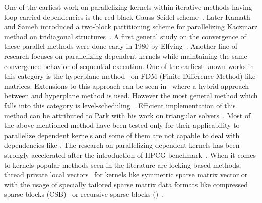 
One of the earliest work on parallelizing kernels within iterative methods having loop-carried dependencies is the red-black Gauss-Seidel 
scheme~\cite{RBGS}. 
Later Kamath and Sameh introduced a two-block partitioning scheme for parallelizing Kaczmarz method on tridiagonal structures~\cite{Kamath}. 
A first general study on the convergence of these parallel methods were done early in 1980 by Elfving~\cite{Elfving1980}. Another line of research focuses on parallelizing dependent kernels while maintaining the same convergence behavior of sequential execution. One of the earliest known works in this category is the hyperplane method~\cite{saad} on FDM (Finite Difference Method) like matrices. Extensions to this approach can be seen in~\cite{cm-rcm} where a hybrid approach between \MCfull and hyperplane method is used. However the most general method which falls into this category is level-scheduling~\cite{saad}.  Efficient implementation of this method can be attributed to Park \etal with his work on triangular solvers~\cite{park_ls}. Most of the above mentioned method have been tested only for their applicability to parallelize \DONE dependent kernels and some of them are not capable to deal with dependencies like \DTWO. The research on parallelizing \DONE dependent kernels has been strongly accelerated after the introduction of HPCG benchmark~\cite{hpcg}. When it comes to \DTWO kernels popular methods seen in the literature are locking based methods, thread private local vectors~\cite{thread_private_symm_spmv,sparseX} for kernels like symmetric sparse matrix vector or with the usage of specially tailored sparse matrix data formats like compressed sparse blocks (CSB)~\cite{CSB} or recursive sparse blocks (\RSB)~\cite{RSB}.

